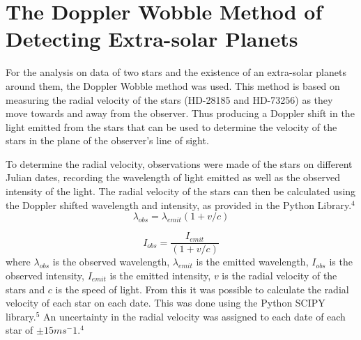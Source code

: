 \documentclass[]{article}
\begin{document}
\section*{The Doppler Wobble Method of Detecting Extra-solar Planets}
\par
For the analysis on data of two stars and the existence of an extra-solar planets 
around them, the Doppler Wobble method was used. This method is based on measuring the 
radial velocity of the stars (HD-28185 and HD-73256) as they move towards and away from 
the observer. Thus
producing a Doppler shift in the light emitted from the stars that can be used to 
determine the velocity of the stars in the plane of the observer's line of sight. 
\par
To determine the radial velocity, observations were made of the stars on different
Julian dates, recording the wavelength of light emitted as well as the observed intensity 
of the light. The radial velocity of the stars can then be calculated using the Doppler
shifted wavelength and intensity, as provided in the Python Library.$^4$ 
\begin{equation}\label{eq:wavelength doppler}\lambda_{obs} = \lambda_{emit}{(1+v/c)}
\end{equation}

\begin{equation}\label{eq:intensity doppler}I_{obs} = \frac{I_{emit}}{(1+v/c)}
\end{equation}
where $\lambda_{obs}$ is the observed wavelength, $\lambda_{emit}$ is the 
emitted wavelength, $I_{obs}$ is the observed intensity, $I_{emit}$ is the emitted 
intensity, $v$ is the radial velocity of the stars and $c$ is the speed of light.
From this it was possible to calculate the radial velocity of each star on each date.
This was done using the Python SCIPY library.$^5$ An uncertainty in the radial velocity
was assigned to each date of each star of $\pm 15 ms^-1$.$^4$
\par
\end{document}
